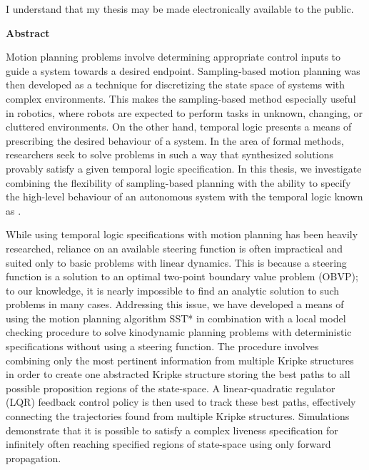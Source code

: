   \bigskip
  
  \noindent
I understand that my thesis may be made electronically available to the public.

\cleardoublepage


\begin{center}\textbf{Abstract}\end{center}
Motion planning problems involve determining appropriate control inputs to guide a system towards a desired endpoint. Sampling-based motion planning was then developed as a technique for discretizing the state space of systems with complex environments. This makes the sampling-based method especially useful in robotics, where robots are expected to perform tasks in unknown, changing, or cluttered environments. On the other hand, temporal logic presents a means of prescribing the desired behaviour of a system. In the area of formal methods, researchers seek to solve problems in such a way that synthesized solutions provably satisfy a given temporal logic specification. In this thesis, we investigate combining the flexibility of sampling-based planning with the ability to specify the high-level behaviour of an autonomous system with the temporal logic known as \mucalc{}.

While using temporal logic specifications with motion planning has been heavily researched, reliance on an available steering function is often impractical and suited only to basic problems with linear dynamics. This is because a steering function is a solution to an optimal two-point boundary value problem (OBVP); to our knowledge, it is nearly impossible to find an analytic solution to such problems in many cases. Addressing this issue, we have developed a means of using the motion planning algorithm SST* in combination with a local model checking procedure to solve kinodynamic planning problems with deterministic \mucalc{} specifications without using a steering function. The procedure involves combining only the most pertinent information from multiple Kripke structures in order to create one abstracted Kripke structure storing the best paths to all possible proposition regions of the state-space. A linear-quadratic regulator (LQR) feedback control policy is then used to track these best paths, effectively connecting the trajectories found from multiple Kripke structures. Simulations demonstrate that it is possible to satisfy a complex liveness specification for infinitely often reaching specified regions of state-space using only forward propagation.

